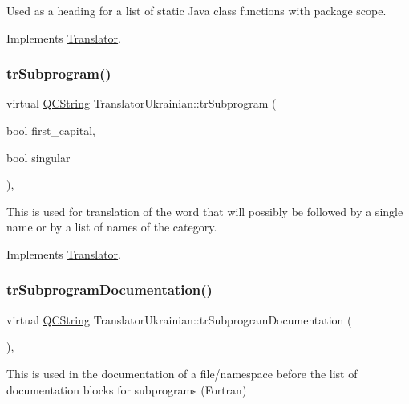 Used as a heading for a list of static Java class functions with package scope. 

Implements \mbox{\hyperlink{class_translator}{Translator}}.

\mbox{\label{class_translator_ukrainian_a96dc2d580e33985cd86699caedd37e69}} 
\subsubsection{\texorpdfstring{trSubprogram()}{trSubprogram()}}
{\footnotesize\ttfamily virtual \mbox{\hyperlink{class_q_c_string}{Q\+C\+String}} Translator\+Ukrainian\+::tr\+Subprogram (\begin{DoxyParamCaption}\item[{bool}]{first\+\_\+capital,  }\item[{bool}]{singular }\end{DoxyParamCaption})\hspace{0.3cm}{\ttfamily [inline]}, {\ttfamily [virtual]}}

This is used for translation of the word that will possibly be followed by a single name or by a list of names of the category. 

Implements \mbox{\hyperlink{class_translator}{Translator}}.

\mbox{\label{class_translator_ukrainian_aabd6d5a4f37b50e8a1c6b843e60df3c1}} 
\subsubsection{\texorpdfstring{trSubprogramDocumentation()}{trSubprogramDocumentation()}}
{\footnotesize\ttfamily virtual \mbox{\hyperlink{class_q_c_string}{Q\+C\+String}} Translator\+Ukrainian\+::tr\+Subprogram\+Documentation (\begin{DoxyParamCaption}{ }\end{DoxyParamCaption})\hspace{0.3cm}{\ttfamily [inline]}, {\ttfamily [virtual]}}

This is used in the documentation of a file/namespace before the list of documentation blocks for subprograms (Fortran) 

